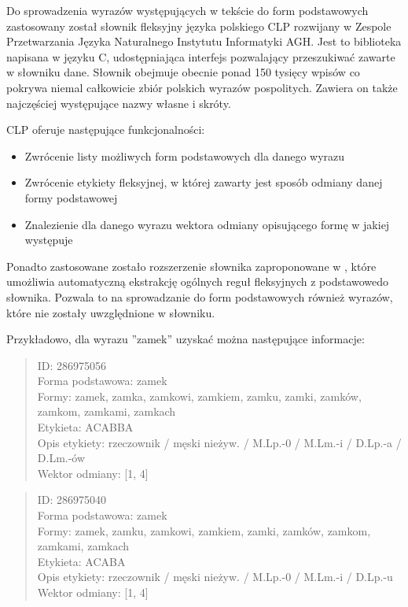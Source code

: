 \documentclass[11pt,a4paper]{article}
\begin{document}
Do sprowadzenia wyrazów występujących w tekście do form podstawowych
zastosowany został słownik fleksyjny języka polskiego CLP
\cite{gajecki-slownik} rozwijany w Zespole Przetwarzania Języka Naturalnego
Instytutu Informatyki AGH. Jest to biblioteka napisana w języku C,
udostępniająca interfejs pozwalający przeszukiwać zawarte w słowniku dane.
Słownik obejmuje obecnie ponad 150 tysięcy wpisów co pokrywa niemal całkowicie
zbiór polskich wyrazów pospolitych. Zawiera on także najczęściej występujące
nazwy własne i skróty.

CLP oferuje następujące funkcjonalności:
\begin{itemize}
\item Zwrócenie listy możliwych form podstawowych dla danego wyrazu
\item Zwrócenie etykiety fleksyjnej, w której zawarty jest sposób odmiany
danej formy podstawowej
\item Znalezienie dla danego wyrazu wektora odmiany opisującego formę
w jakiej występuje
\end{itemize}

Ponadto zastosowane zostało rozszerzenie słownika zaproponowane w
\cite{korzycki-stemmer}, które umożliwia automatyczną ekstrakcję ogólnych reguł
fleksyjnych z podstawowedo słownika.  Pozwala to na sprowadzanie do form
podstawowych również wyrazów, które nie zostały uwzględnione w słowniku.

Przykładowo, dla wyrazu ''zamek'' uzyskać można następujące informacje:

\begin{quote}
ID: 286975056\\
Forma podstawowa: zamek\\
Formy: zamek, zamka, zamkowi, zamkiem, zamku, zamki, zamków, zamkom, zamkami,
zamkach\\
Etykieta: ACABBA\\
Opis etykiety: rzeczownik / męski nieżyw. / M.Lp.-0 / M.Lm.-i / D.Lp.-a /
D.Lm.-ów\\
Wektor odmiany: [1, 4]\\
\end{quote}

\begin{quote}
ID: 286975040\\
Forma podstawowa: zamek\\
Formy: zamek, zamku, zamkowi, zamkiem, zamki, zamków, zamkom, zamkami,
zamkach\\
Etykieta: ACABA\\
Opis etykiety: rzeczownik / męski nieżyw. / M.Lp.-0 / M.Lm.-i / D.Lp.-u\\
Wektor odmiany: [1, 4]\\
\end{quote}
\pagebreak
\end{document}
